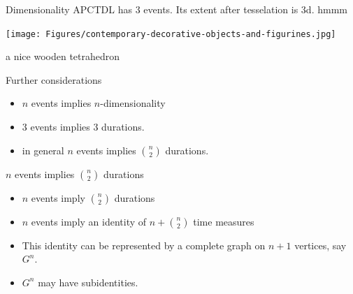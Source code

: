 \documentclass[20pt]{beamer}
\begin{document}

\begin{frame}[plain]
\begin{block}{Dimensionality}
APCTDL has 3 events. Its extent after tesselation is 3d. hmmm
\end{block}
\vspace{1em}
\begin{center}
\texttt{[image: Figures/contemporary-decorative-objects-and-figurines.jpg]}

a nice wooden tetrahedron
\end{center}
\end{frame}


\begin{frame}[plain]
\begin{center}
\Large Further considerations
\begin{itemize}[<+->]
  \item $n$ events implies $n$-dimensionality
  \item 3 events implies 3 durations.
  \item in general $n$ events implies $\binom{n}{2}$ durations.
\end{itemize}
\end{center}
\end{frame}


\begin{frame}[plain]
\begin{center}
\Large $n$ events implies $\binom{n}{2}$ durations


\end{center}
\end{frame}


\begin{frame}[plain]
\begin{center}
\Large
\begin{itemize}[<+->]
  \item $n$ events imply $\binom{n}{2}$ durations
  \item $n$ events imply an identity of $n + \binom{n}{2}$ time measures
  \item This identity can be represented by a complete graph on $n+1$ vertices,
  say $G^n$.
  \item $G^n$ may have subidentities.
\end{itemize}

\end{center}
\end{frame}
\end{document}
